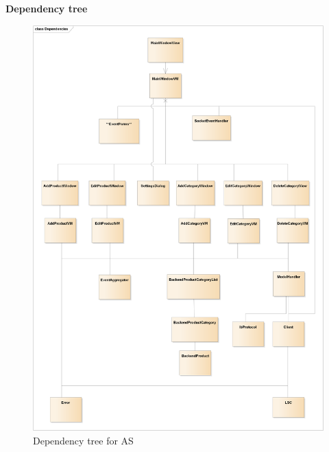 \textbf{Dependency tree}
\begin{figure}[H]
	\centering
	\includegraphics[width=1\textwidth]{Test/Integrationstest/Images/AS-Dependencies}
	\caption{Dependency tree for \gls{AS}}
	\label{fig:AS-dependencies}
\end{figure}

